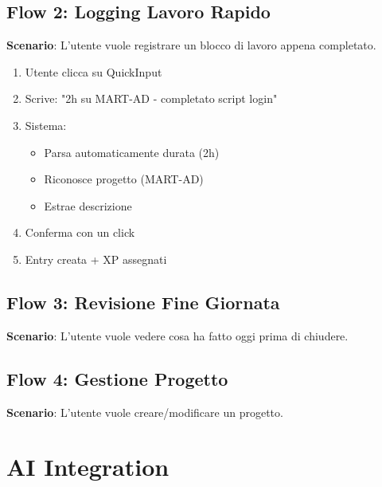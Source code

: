 \documentclass[11pt,a4paper]{article}
\begin{document}

\subsection{Flow 2: Logging Lavoro Rapido}

\textbf{Scenario}: L'utente vuole registrare un blocco di lavoro appena completato.

\begin{enumerate}
    \item Utente clicca su QuickInput
    \item Scrive: "2h su MART-AD - completato script login"
    \item Sistema:
    \begin{itemize}
        \item Parsa automaticamente durata (2h)
        \item Riconosce progetto (MART-AD)
        \item Estrae descrizione
    \end{itemize}
    \item Conferma con un click
    \item Entry creata + XP assegnati
\end{enumerate}


\subsection{Flow 3: Revisione Fine Giornata}

\textbf{Scenario}: L'utente vuole vedere cosa ha fatto oggi prima di chiudere.


\subsection{Flow 4: Gestione Progetto}

\textbf{Scenario}: L'utente vuole creare/modificare un progetto.


\newpage

\section{AI Integration}
\end{document}
